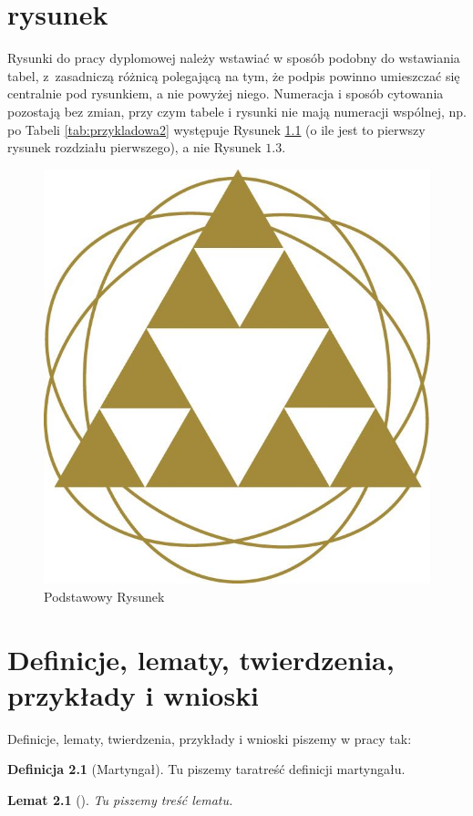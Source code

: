 \documentclass[inzynierska]{pwr_wmat_praca_dyplomowa}
\theoremstyle{plain}
\numberwithin{theorem}{chapter}
\newtheorem{lemma}[theorem]{Lemat}
\theoremstyle{definition}
\numberwithin{theorem}{chapter}
\newtheorem{definition}[theorem]{Definicja}
\begin{document}
\chapter{rysunek}
Rysunki do pracy dyplomowej należy wstawiać w sposób podobny do wstawiania tabel, z~zasadniczą różnicą polegającą na tym, że podpis powinno umieszczać się centralnie pod rysunkiem, a nie powyżej niego. Numeracja i sposób cytowania pozostają bez zmian, przy czym tabele i rysunki nie mają numeracji wspólnej, np. po Tabeli \ref{tab:przykladowa2} występuje Rysunek \ref{rys1} (o ile jest to pierwszy rysunek rozdziału pierwszego), a nie Rysunek $1.3$.

\begin{figure}[ht]
	
	\centering
	
	\includegraphics[scale=0.27]{logo_w13.jpg}
	\caption{Podstawowy Rysunek}\label{rys1}
\end{figure}
\label{rys:przykladowy} 


\chapter{Definicje, lematy, twierdzenia, przykłady i wnioski}
Definicje, lematy, twierdzenia, przykłady i wnioski piszemy w pracy tak:
\begin{definition}[Martyngał]
	Tu piszemy taratreść definicji martyngału.
\end{definition}
\begin{lemma}[]%
	Tu piszemy treść lematu.
\end{lemma}
\end{document}
